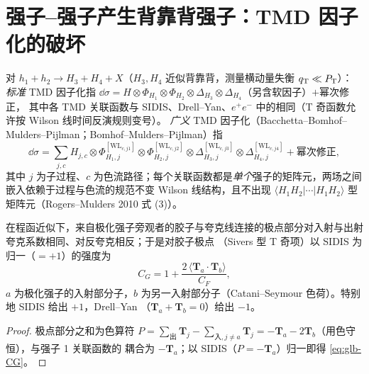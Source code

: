 \section{强子–强子产生背靠背强子：TMD 因子化的破坏}\label{sec:glb-tmdbreak}

\begin{definition}\label{def:glb-gentmd}
对 $h_1+h_2\to H_3+H_4+X$（$H_3,H_4$ 近似背靠背，测量横动量失衡 $q_{\mathrm{T}}\ll P_{\mathrm T}$）：
\emph{标准} TMD 因子化指 $\dd\sigma=H\otimes\Phi_{H_1}\otimes\Phi_{H_2}\otimes\Delta_{H_3}\otimes\Delta_{H_4}$（另含软因子）$+$幂次修正，
其中各 TMD 关联函数与 SIDIS、Drell--Yan、$e^+e^-$ 中的相同（T 奇函数允许按 Wilson 线时间反演规则变号）。
\emph{广义} TMD 因子化（Bacchetta--Bomhof--Mulders--Pijlman；Bomhof--Mulders--Pijlman）指
\begin{equation}\label{eq:glb-gentmd}
\dd\sigma=\sum_{j,c}H_{j,c}\otimes\Phi^{[\mathrm{WL}_{c,j1}]}_{H_1,j}\otimes\Phi^{[\mathrm{WL}_{c,j2}]}_{H_2,j}\otimes
\Delta^{[\mathrm{WL}_{c,j3}]}_{H_3,j}\otimes\Delta^{[\mathrm{WL}_{c,j4}]}_{H_4,j}+\text{幂次修正},
\end{equation}
其中 $j$ 为子过程、$c$ 为色流路径；每个关联函数都是\emph{单个}强子的矩阵元，两场之间嵌入依赖于过程与色流的规范不变
Wilson 线结构，且不出现 $\langle H_1H_2|\cdots|H_1H_2\rangle$ 型矩阵元（Rogers--Mulders 2010 式 (3)）。
\end{definition}

\begin{proposition}\label{prop:glb-CG}
在程函近似下，来自极化强子旁观者的胶子与夸克线连接的极点部分对入射与出射夸克系数相同、对反夸克相反；于是对胶子极点
（Sivers 型 T 奇项）以 SIDIS 为归一（$=+1$）的强度为
\begin{equation}\label{eq:glb-CG}
C_G=1+\frac{2\,\langle\bm T_a\!\cdot\!\bm T_b\rangle}{C_F},
\end{equation}
$a$ 为极化强子的入射部分子，$b$ 为另一入射部分子（Catani--Seymour 色荷）。特别地 SIDIS 给出 $+1$，Drell--Yan
（$\bm T_a+\bm T_b=0$）给出 $-1$。
\end{proposition}
\begin{proof}
极点部分之和为色算符 $P=\sum_{\text{出}}\bm T_j-\sum_{\text{入},j\neq a}\bm T_j=-\bm T_a-2\bm T_b$（用色守恒），与强子 1 关联函数的
耦合为 $-\bm T_a$；以 SIDIS（$P=-\bm T_a$）归一即得 \eqref{eq:glb-CG}。
\end{proof}

